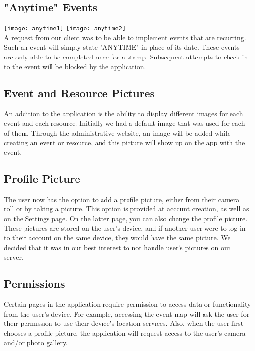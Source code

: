 \documentclass[onecolumn, draftclsnofoot,10pt, compsoc]{IEEEtran}
\begin{document}
  \subsection{"Anytime" Events}
    \texttt{[image: anytime1]}
    \texttt{[image: anytime2]} \\
    A request from our client was to be able to implement events that are recurring. Such an event will simply state "ANYTIME" in place of its date. These events are only
    able to be completed once for a stamp. Subsequent attempts to check in to the event will be blocked by the application.

  \subsection{Event and Resource Pictures}
    An addition to the application is the ability to display different images for each event and each resource. Initially we had a default image that was used for each of them.
    Through the administrative website, an image will be added while creating an event or resource, and this picture will show up on the app with the event.

  \subsection{Profile Picture}
    The user now has the option to add a profile picture, either from their camera roll or by taking a picture. This option is provided at account creation, as well as on the Settings
    page. On the latter page, you can also change the profile picture. These pictures are stored on the user's device, and if another user were to log in to their account on the
    same device, they would have the same picture. We decided that it was in our best interest to not handle user's pictures on our server.

  \subsection{Permissions}
    Certain pages in the application require permission to access data or functionality from the user's device. For example, accessing the event map will ask the user for their
    permission to use their device's location services. Also, when the user first chooses a profile picture, the application will request access to the user's camera and/or photo gallery.
\end{document}
